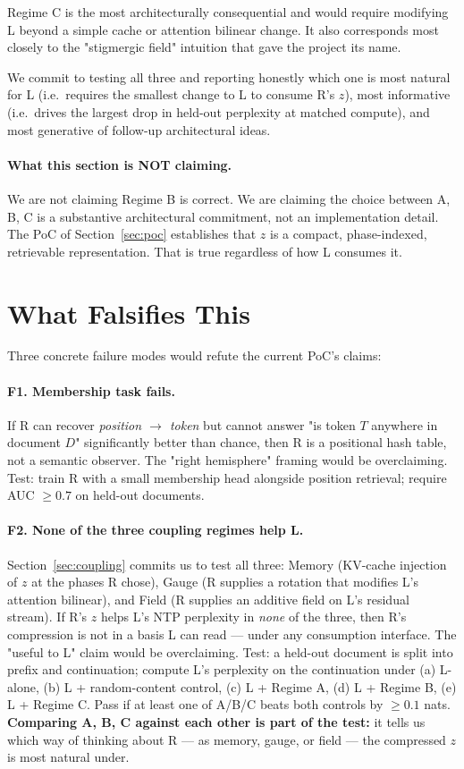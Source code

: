 \documentclass[10pt, twocolumn, a4paper]{article}
\begin{document}
Regime C is the most architecturally consequential and would require modifying L beyond a simple cache or attention bilinear change. It also corresponds most closely to the "stigmergic field" intuition that gave the project its name.

We commit to testing all three and reporting honestly which one is most natural for L (i.e.~requires the smallest change to L to consume R's $z$), most informative (i.e.~drives the largest drop in held-out perplexity at matched compute), and most generative of follow-up architectural ideas.

\paragraph{What this section is NOT claiming.} We are not claiming Regime B is correct. We are claiming the choice between A, B, C is a substantive architectural commitment, not an implementation detail. The PoC of Section~\ref{sec:poc} establishes that $z$ is a compact, phase-indexed, retrievable representation. That is true regardless of how L consumes it.


\section{What Falsifies This}
\label{sec:falsification}

Three concrete failure modes would refute the current PoC's claims:

\paragraph{F1. Membership task fails.} If R can recover \emph{position $\to$ token} but cannot answer "is token $T$ anywhere in document $D$" significantly better than chance, then R is a positional hash table, not a semantic observer. The "right hemisphere" framing would be overclaiming. Test: train R with a small membership head alongside position retrieval; require AUC $\ge 0.7$ on held-out documents.

\paragraph{F2. None of the three coupling regimes help L.}
Section~\ref{sec:coupling} commits us to test all three: Memory (KV-cache injection of $z$ at the phases R chose), Gauge (R supplies a rotation that modifies L's attention bilinear), and Field (R supplies an additive field on L's residual stream). If R's $z$ helps L's NTP perplexity in \emph{none} of the three, then R's compression is not in a basis L can read --- under any consumption interface. The "useful to L" claim would be overclaiming. Test: a held-out document is split into prefix and continuation; compute L's perplexity on the continuation under (a) L-alone, (b) L + random-content control, (c) L + Regime A, (d) L + Regime B, (e) L + Regime C. Pass if at least one of A/B/C beats both controls by $\ge 0.1$ nats. \textbf{Comparing A, B, C against each other is part of the test:} it tells us which way of thinking about R --- as memory, gauge, or field --- the compressed $z$ is most natural under.
\end{document}
